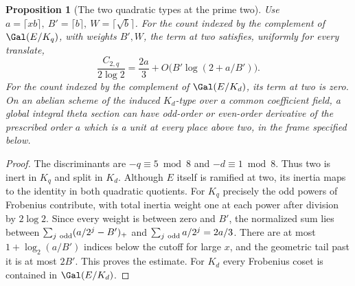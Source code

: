 \documentclass[a4paper,11pt]{article}
\newtheorem{proposition}{Proposition}[section]
\theoremstyle{definition}
\theoremstyle{remark}
\numberwithin{equation}{section}
\begin{document}
\begin{proposition}[The two quadratic types at the prime two]\label{prop:dyad46}
Use \(a=\lceil xb\rceil,\ B'=\lceil b\rceil,\ W=\lceil\sqrt b\rceil\).
For the count indexed by the complement of \(\Gal(E/K_q)\), with weights
\(B',W\), the term at two satisfies, uniformly for every translate,
\[
 \frac{C_{2,q}}{2\log 2}=\frac{2a}{3}
                       +O\bigl(B'\log(2+a/B')\bigr).
\]
For the count indexed by the complement of \(\Gal(E/K_d)\), its term
at two is zero. On an abelian scheme of the induced \(K_d\)-type over
a common coefficient field, a global integral theta section can have
odd-order or even-order derivative of the prescribed order \(a\) which
is a unit at every place above two, in the frame specified below.
\end{proposition}
\begin{proof}
The discriminants are \(-q\equiv5\bmod8\) and \(-d\equiv1\bmod8\).
Thus two is inert in \(K_q\) and split in \(K_d\). Although \(E\)
itself is ramified at two, its inertia maps to the identity in both
quadratic quotients. For \(K_q\) precisely the odd powers of Frobenius
contribute, with total inertia weight one at each power after division
by \(2\log2\). Since every weight is between zero and \(B'\), the
normalized sum lies between \(\sum_{j\ {\rm odd}}(a/2^j-B')_+\)
and \(\sum_{j\ {\rm odd}}a/2^j=2a/3\). There are at most
\(1+\log_2(a/B')\) indices below the cutoff for large \(x\), and the
geometric tail past it is at most \(2B'\). This proves the estimate.
For \(K_d\) every Frobenius coset is contained in \(\Gal(E/K_d)\).


\end{proof}
\end{document}

